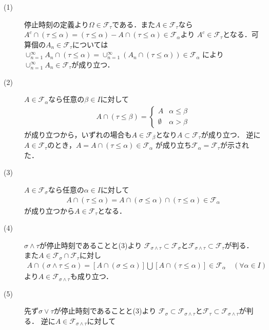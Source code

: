 	\begin{prf}\mbox{}
		\begin{description}
			\item[(1)] 停止時刻の定義より$\Omega \in \mathcal{F}_\tau$である．また$A \in \mathcal{F}_\tau$なら
				$A^c \cap (\tau \leq \alpha) = (\tau \leq \alpha) - A \cap (\tau \leq \alpha) \in \mathcal{F}_\alpha$より
				$A^c \in \mathcal{F}_\tau$となる．可算個の$A_n \in \mathcal{F}_\tau$については
				$\cup_{n=1}^{\infty} A_n \cap (\tau \leq \alpha) = \cup_{n=1}^{\infty} \left(A_n \cap (\tau \leq \alpha)\right) \in \mathcal{F}_\alpha$
				により$\cup_{n=1}^{\infty} A_n \in \mathcal{F}_\tau$が成り立つ．
			
			\item[(2)] $A \in \mathcal{F}_\alpha$なら任意の$\beta \in I$に対して
				\begin{align}
					A \cap (\tau \leq \beta) =
					\begin{cases}
						A & \alpha \leq \beta \\
						\emptyset & \alpha > \beta
					\end{cases}
				\end{align}
				が成り立つから，いずれの場合も$A \in \mathcal{F}_\beta$となり$A \subset \mathcal{F}_\tau$が成り立つ．
				逆に$A \in \mathcal{F}_\tau$のとき，$A = A \cap (\tau \leq \alpha) \in \mathcal{F}_\alpha$
				が成り立ち$\mathcal{F}_\alpha = \mathcal{F}_\tau$が示された．
				
			\item[(3)] $A \in \mathcal{F}_\sigma$なら任意の$\alpha \in I$に対して
				\begin{align}
					A \cap (\tau \leq \alpha) = A \cap (\sigma \leq \alpha) \cap (\tau \leq \alpha) \in \mathcal{F}_\alpha
				\end{align}
				が成り立つから$A \in \mathcal{F}_\tau$となる．
			
			\item[(4)] $\sigma \wedge \tau$が停止時刻であることと(3)より
				$\mathcal{F}_{\sigma \wedge \tau} \subset \mathcal{F}_\sigma$と$\mathcal{F}_{\sigma \wedge \tau} \subset \mathcal{F}_\tau$が判る．
				また$A \in \mathcal{F}_\sigma \cap \mathcal{F}_\tau$に対し
				\begin{align}
					A \cap (\sigma \wedge \tau \leq \alpha) = [A \cap (\sigma \leq \alpha)] \bigcup [A \cap (\tau \leq \alpha)] \in \mathcal{F}_\alpha \quad (\forall \alpha \in I)
				\end{align}
				より$A \in \mathcal{F}_{\sigma \wedge \tau}$も成り立つ．
			
			\item[(5)] 
				先ず$\sigma \vee \tau$が停止時刻であることと(3)より
				$\mathcal{F}_\sigma \subset \mathcal{F}_{\sigma \wedge \tau}$と$\mathcal{F}_\tau \subset \mathcal{F}_{\sigma \wedge \tau}$が判る．
				逆に$A \in \mathcal{F}_{\sigma \wedge \tau}$に対して
				
		\end{description}
	\end{prf}
	
